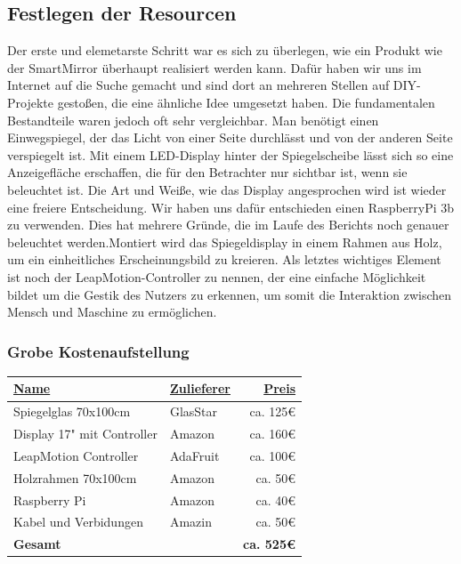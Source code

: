 \documentclass[12pt, a4paper]{scrartcl}
\begin{document}
	\subsection{Festlegen der Resourcen}
	Der erste und elemetarste Schritt war es sich zu überlegen, wie ein Produkt wie der SmartMirror überhaupt realisiert werden kann. Dafür haben wir uns im Internet auf die Suche gemacht und sind dort an mehreren Stellen auf DIY-Projekte gestoßen, die eine ähnliche Idee umgesetzt haben. Die fundamentalen Bestandteile waren jedoch oft sehr vergleichbar. Man benötigt einen Einwegspiegel, der das Licht von einer Seite durchlässt und von der anderen Seite verspiegelt ist. Mit einem LED-Display hinter der Spiegelscheibe lässt sich so eine Anzeigefläche erschaffen, die für den Betrachter nur sichtbar ist, wenn sie beleuchtet ist. Die Art und Weiße, wie das Display angesprochen wird ist wieder eine freiere Entscheidung. Wir haben uns dafür entschieden einen RaspberryPi 3b zu verwenden. Dies hat mehrere Gründe, die im Laufe des Berichts noch genauer beleuchtet werden.Montiert wird das Spiegeldisplay in einem Rahmen aus Holz, um ein einheitliches Erscheinungsbild zu kreieren. Als letztes wichtiges Element ist noch der LeapMotion-Controller zu nennen, der eine einfache Möglichkeit bildet um die Gestik des Nutzers zu erkennen, um somit die Interaktion zwischen Mensch und Maschine zu ermöglichen.
	
	\subsubsection*{Grobe Kostenaufstellung}
	\begin{tabularx}{0.95\textwidth}{|X|l|r|}
		\hline
		\textcolor{tumbleweed}{\underline{\textbf{Name}}} & \textcolor{tumbleweed}{\underline{\textbf{Zulieferer}}} & \textcolor{tumbleweed}{\underline{\textbf{Preis}}}\\
		\hline
		Spiegelglas 70x100cm & GlasStar&ca. 125\euro\\
		\hline
		Display 17" mit Controller & Amazon & ca. 160\euro\\
		\hline
		LeapMotion Controller & AdaFruit & ca. 100\euro \\
		\hline
		Holzrahmen 70x100cm & Amazon & ca. 50\euro\\
		\hline
		Raspberry Pi & Amazon & ca. 40\euro\\
		\hline
		Kabel und Verbidungen & Amazin & ca. 50\euro\\
		\hline
		\textcolor{tumbleweed}{\textbf{Gesamt}}& & \textbf{ca. 525\euro}\\
		\hline
	\end{tabularx}
	
\end{document}
